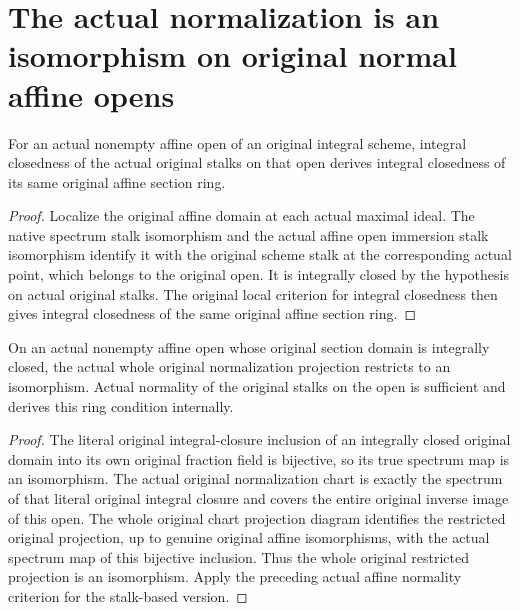 \section{The actual normalization is an isomorphism on original normal affine opens}

\begin{lemma}
\label{lem:actual-normal-affine-open-section-ring}
\leanok
For an actual nonempty affine open of an original integral scheme,
integral closedness of the actual original stalks on that open
derives integral closedness of its same original affine section ring.
\end{lemma}
\begin{proof}
Localize the original affine domain at each actual maximal ideal.
The native spectrum stalk isomorphism and the actual affine open
immersion stalk isomorphism identify it with the original scheme
stalk at the corresponding actual point, which belongs to the
original open. It is integrally closed by the hypothesis on actual
original stalks. The original local criterion for integral
closedness then gives integral closedness of the same original
affine section ring.
\end{proof}

\begin{lemma}
\label{lem:actual-normalization-affine-isomorphism}
\leanok
{}
On an actual nonempty affine open whose original section domain is
integrally closed, the actual whole original normalization
projection restricts to an isomorphism. Actual normality of the
original stalks on the open is sufficient and derives this ring
condition internally.
\end{lemma}
\begin{proof}
The literal original integral-closure inclusion of an integrally
closed original domain into its own original fraction field is
bijective, so its true spectrum map is an isomorphism. The actual
original normalization chart is exactly the spectrum of that
literal original integral closure and covers the entire original
inverse image of this open. The whole original chart projection
diagram identifies the restricted original projection, up to
genuine original affine isomorphisms, with the actual spectrum map
of this bijective inclusion. Thus the whole original restricted
projection is an isomorphism. Apply the preceding actual affine
normality criterion for the stalk-based version.
\end{proof}
